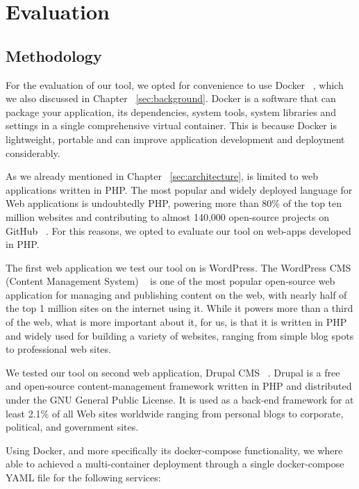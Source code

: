 \chapter{Evaluation}
\label{sec:evaluation}
\minitoc
\vspace*{1cm}



\section{Methodology}
\label{sec:dockerStack}
For the evaluation of our tool, we opted for convenience to use Docker ~\cite{docker_def}, which we also discussed in Chapter ~\ref{sec:background}. Docker is a software that can package your application, its dependencies, system tools, system libraries and settings in a single comprehensive virtual container. This is because Docker is lightweight, portable and can improve application development and deployment considerably.

As we already mentioned in Chapter ~\ref{sec:architecture}, \pname{} is limited to web applications written in PHP. The most popular and widely deployed language for Web applications is undoubtedly PHP, powering more than 80\% of the top ten million websites and contributing to almost 140,000 open-source projects on GitHub ~\cite{githubinfo}. For this reasons, we opted to evaluate our tool on web-apps developed in PHP.

The first web application we test our tool on is WordPress. The WordPress CMS (Content Management System) ~\cite{docker_def} is one of the most popular open-source web application for managing and publishing content on the web, with nearly half of the top 1 million sites on the internet using it. While it powers more than a third of the web, what is more important about it, for us, is that it is written in PHP and widely used for building a variety of websites, ranging from simple blog spots to professional web sites. 

We tested our tool on second web application, Drupal CMS ~\cite{drupal}. Drupal is a free and open-source content-management framework written in PHP and distributed under the GNU General Public License. It is used as a back-end framework for at least 2.1\% of all Web sites worldwide ranging from personal blogs to corporate, political, and government sites.

Using Docker, and more specifically its docker-compose functionality, we where able to achieved a multi-container deployment through a single docker-compose YAML file for the following services:

